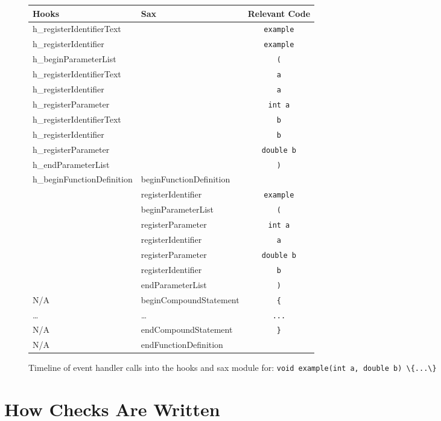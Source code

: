 \documentclass[12pt]{report}
\begin{document}
\begin{figure}
\begin{center}
\begin{tabular}{llc}
\toprule
Hooks & Sax  & Relevant Code\\
\midrule
h\_registerIdentifierText & & \lstinline!example! \\
h\_registerIdentifier & & \lstinline!example! \\
h\_beginParameterList & & \lstinline!(! \\
h\_registerIdentifierText & & \lstinline!a! \\
h\_registerIdentifier & & \lstinline!a! \\
h\_registerParameter & & \lstinline!int a! \\
h\_registerIdentifierText & & \lstinline!b! \\
h\_registerIdentifier & & \lstinline!b! \\
h\_registerParameter & & \lstinline!double b! \\
h\_endParameterList & & \lstinline!)! \\
h\_beginFunctionDefinition & beginFunctionDefinition & \\
 & registerIdentifier & \lstinline!example! \\
 & beginParameterList & \lstinline!(! \\
 & registerParameter & \lstinline!int a! \\
 & registerIdentifier & \lstinline!a! \\
 & registerParameter & \lstinline!double b!\\
 & registerIdentifier & \lstinline!b!\\
 & endParameterList & \lstinline!)!\\
N/A & beginCompoundStatement & \lstinline!{!\\
\ldots & \ldots & \lstinline!...! \\
N/A & endCompoundStatement & \lstinline!}!\\
N/A & endFunctionDefinition \\
 \bottomrule
\end{tabular}
\end{center}
\caption[Timeline of Event Handler Calls]{Timeline of event handler calls into the hooks and sax module for: \lstinline!void example(int a, double b) \{...\}!}
\label{handlerTimeline}
\end{figure}
\newpage

\section{How Checks Are Written}
\label{howChecksAreWritten}
\end{document}
